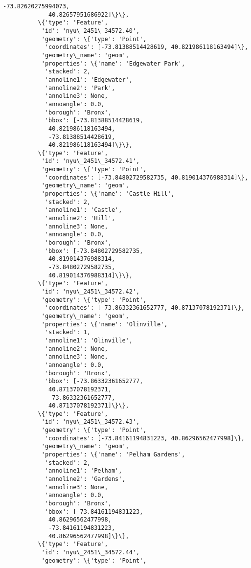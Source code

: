 \documentclass[11pt]{article}
\begin{document}
\begin{Verbatim}[commandchars=\\\{\}]
             -73.82620275994073,
             40.82657951686922]\}\},
          \{'type': 'Feature',
           'id': 'nyu\_2451\_34572.40',
           'geometry': \{'type': 'Point',
            'coordinates': [-73.81388514428619, 40.821986118163494]\},
           'geometry\_name': 'geom',
           'properties': \{'name': 'Edgewater Park',
            'stacked': 2,
            'annoline1': 'Edgewater',
            'annoline2': 'Park',
            'annoline3': None,
            'annoangle': 0.0,
            'borough': 'Bronx',
            'bbox': [-73.81388514428619,
             40.821986118163494,
             -73.81388514428619,
             40.821986118163494]\}\},
          \{'type': 'Feature',
           'id': 'nyu\_2451\_34572.41',
           'geometry': \{'type': 'Point',
            'coordinates': [-73.84802729582735, 40.819014376988314]\},
           'geometry\_name': 'geom',
           'properties': \{'name': 'Castle Hill',
            'stacked': 2,
            'annoline1': 'Castle',
            'annoline2': 'Hill',
            'annoline3': None,
            'annoangle': 0.0,
            'borough': 'Bronx',
            'bbox': [-73.84802729582735,
             40.819014376988314,
             -73.84802729582735,
             40.819014376988314]\}\},
          \{'type': 'Feature',
           'id': 'nyu\_2451\_34572.42',
           'geometry': \{'type': 'Point',
            'coordinates': [-73.86332361652777, 40.87137078192371]\},
           'geometry\_name': 'geom',
           'properties': \{'name': 'Olinville',
            'stacked': 1,
            'annoline1': 'Olinville',
            'annoline2': None,
            'annoline3': None,
            'annoangle': 0.0,
            'borough': 'Bronx',
            'bbox': [-73.86332361652777,
             40.87137078192371,
             -73.86332361652777,
             40.87137078192371]\}\},
          \{'type': 'Feature',
           'id': 'nyu\_2451\_34572.43',
           'geometry': \{'type': 'Point',
            'coordinates': [-73.84161194831223, 40.86296562477998]\},
           'geometry\_name': 'geom',
           'properties': \{'name': 'Pelham Gardens',
            'stacked': 2,
            'annoline1': 'Pelham',
            'annoline2': 'Gardens',
            'annoline3': None,
            'annoangle': 0.0,
            'borough': 'Bronx',
            'bbox': [-73.84161194831223,
             40.86296562477998,
             -73.84161194831223,
             40.86296562477998]\}\},
          \{'type': 'Feature',
           'id': 'nyu\_2451\_34572.44',
           'geometry': \{'type': 'Point',

\end{Verbatim}
\end{document}
